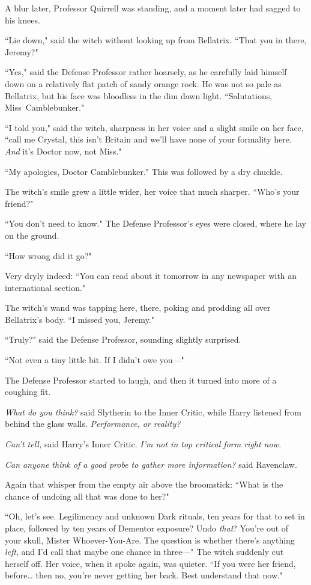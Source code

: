 A blur later, Professor Quirrell was standing, and a moment later had sagged to his knees.

``Lie down," said the witch without looking up from Bellatrix. ``That you in there, Jeremy?"

``Yes," said the Defense Professor rather hoarsely, as he carefully laid himself down on a relatively flat patch of sandy orange rock. He was not so pale as Bellatrix, but his face was bloodless in the dim dawn light. ``Salutations, Miss~Camblebunker."

``I told you," said the witch, sharpness in her voice and a slight smile on her face, ``call me Crystal, this isn't Britain and we'll have none of your formality here. \emph{And} it's Doctor now, not Miss."

``My apologies, Doctor Camblebunker." This was followed by a dry chuckle.

The witch's smile grew a little wider, her voice that much sharper. ``Who's your friend?"

``You don't need to know." The Defense Professor's eyes were closed, where he lay on the ground.

``How wrong did it go?"

Very dryly indeed: ``You can read about it tomorrow in any newspaper with an international section."

The witch's wand was tapping here, there, poking and prodding all over Bellatrix's body. ``I missed you, Jeremy."

``Truly?" said the Defense Professor, sounding slightly surprised.

``Not even a tiny little bit. If I didn't owe you—"

The Defense Professor started to laugh, and then it turned into more of a coughing fit.

\emph{What do you think?} said Slytherin to the Inner Critic, while Harry listened from behind the glass walls. \emph{Performance, or reality?}

\emph{Can't tell,} said Harry's Inner Critic. \emph{I'm not in top critical form right now.}

\emph{Can anyone think of a good probe to gather more information?} said Ravenclaw.

Again that whisper from the empty air above the broomstick: ``What is the chance of undoing all that was done to her?"

``Oh, let's see. Legilimency and unknown Dark rituals, ten years for that to set in place, followed by ten years of Dementor exposure? Undo \emph{that}? You're out of your skull, Mister Whoever-You-Are. The question is whether there's anything \emph{left}, and I'd call that maybe one chance in three—" The witch suddenly cut herself off. Her voice, when it spoke again, was quieter. ``If you were her friend, before{\ldots} then no, you're never getting her back. Best understand that now."

